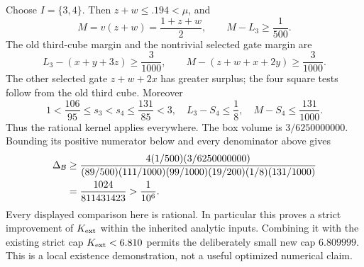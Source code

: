 \documentclass[11pt]{article}
\begin{document}
Choose \(I=\{3,4\}\).
Then \(z+w\le.194<\mu\), and
\[
 M=v(z+w)=\frac{1+z+w}{2},\qquad M-L_3\ge\frac1{500}.
\]
The old third-cube margin and the nontrivial selected gate margin are
\[
 L_3-(x+y+3z)\ge\frac3{1000},\qquad
 M-(z+w+x+2y)\ge\frac3{1000}.
\]
The other selected gate \(z+w+2x\) has greater surplus;
the four square tests follow from the old third cube.
Moreover
\[
 1<\frac{106}{95}\le s_3<s_4\le\frac{131}{85}<3,
 \quad L_3-S_4\le\frac18,\quad M-S_4\le\frac{131}{1000}.
\]
Thus the rational kernel applies everywhere.
The box volume is \(3/6250000000\).
Bounding its positive numerator below and every denominator above gives
\begin{align}
 \Delta_{\mathcal B}
 &\ge
 \frac{4(1/500)(3/6250000000)}
 {(89/500)(111/1000)(99/1000)(19/200)(1/8)(131/1000)}
 \notag\\
 &=\frac{1024}{811431423}>\frac1{10^6}.
 \label{eq:fourth-prefix-exact-small-gain}
\end{align}
Every displayed comparison here is rational.
In particular this proves a strict improvement of \(K_{\rm ext}\)
within the inherited analytic inputs.
Combining it with the existing strict cap \(K_{\rm ext}<6.810\)
permits the deliberately small new cap \(6.809999\).
This is a local existence demonstration, not a useful optimized
numerical claim.
\end{document}
